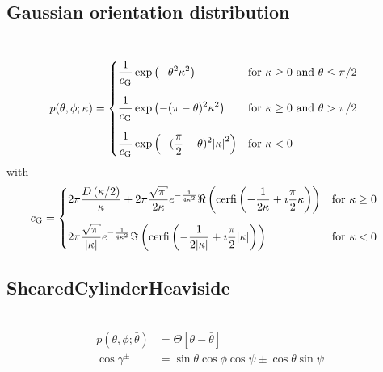 \subsection{Gaussian orientation distribution}
\label{sect:ShearedCylinderGaussian}
~\\
\begin{align}
p(\theta,\phi;\kappa) & = 
\begin{cases}
\displaystyle
\frac{1}{c_\mathrm{G}}\exp\left(-\theta^2\kappa^2\right) & \mathrm{for~} \kappa \geq 0 \mathrm{~and~} \theta \leq \pi/2\\[5mm]
\displaystyle
\frac{1}{c_\mathrm{G}}\exp\left(-(\pi-\theta)^2\kappa^2\right) & \mathrm{for~} \kappa \geq 0 \mathrm{~and~} \theta > \pi/2\\[5mm]
\displaystyle
\frac{1}{c_\mathrm{G}}\exp\left(-(\frac{\pi}{2}-\theta)^2\abs{\kappa}^2\right) & \mathrm{for~} \kappa < 0 
\end{cases}
\end{align}
with
\begin{align}
c_\mathrm{G} & =
\begin{cases}\displaystyle
2\pi\frac{D\left(\kappa/2\right)}{\kappa}
           +2\pi\frac{\sqrt{\pi}}{2\kappa} e^{-\frac{1}{4\kappa^2}} \Re\left(\mathrm{cerfi}\left(-\frac{1}{2\kappa}+\imath\frac{\pi}{2}\kappa\right) \right)& \mathrm{for~} \kappa \geq 0 \\[5mm]
\displaystyle
2\pi\frac{\sqrt{\pi}}{\abs{\kappa}} e^{-\frac{1}{4\kappa^2}} \Im\left(\mathrm{cerfi}\left(-\frac{1}{2\abs{\kappa}}+\imath\frac{\pi}{2}\abs{\kappa}\right) \right) & \mathrm{for~} \kappa < 0
\end{cases}
\end{align}

\newpage
\subsection{ShearedCylinderHeaviside} ~\\

\begin{align}
p(\theta,\phi;\bar{\theta}) & = \Theta[\theta-\bar{\theta}] \\
\cos\gamma^\pm & = \sin\theta\cos\phi\cos\psi\pm\cos\theta\sin\psi
\end{align}

%

